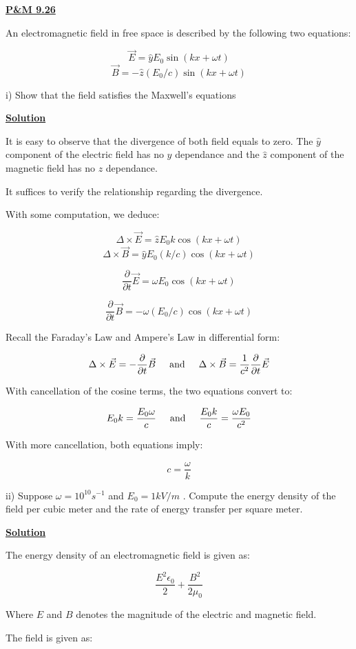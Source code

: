 \documentclass{article}
\newcommand{\new}[1]{
    \vspace{2mm}
    \noindent
    \textbf{
    \underline{#1}}
}
\newcommand{\textAnd}{
    {
        \hspace{5mm}
        \textrm{and}
        \hspace{5mm}
    }
}
\newcommand{\hy}{\hat{y}}
\newcommand{\hz}{\hat{z}}
\newcommand{\parderiv}[1]{{
    \frac{\partial}{\partial{#1}}
}
}
\begin{document}
\new{P\&M 9.26}
An electromagnetic field in free space is described 
by the following two equations:

\[
    \vec{E} = \hy E_0 \sin(kx + \omega t)
\]
\[
    \vec{B} = -\hz (E_0/c) \sin(kx + \omega t)
\]

i) Show that the field satisfies the Maxwell's equations 

\new{Solution}
It is easy to observe that the divergence of both field 
equals to zero. The $\hy$ component of the electric field 
has no $y$ dependance and the $\hz$ component of the 
magnetic field has no $z$ dependance. 

It suffices to verify the relationship regarding the divergence. 

With some computation, we deduce:

\[
    \Delta \times \vec{E} 
    = 
    \hz E_0 k \cos(kx+ \omega t)
\]
\[
    \Delta \times \vec{B}
    =
    \hy E_0(k/c) \cos(kx + \omega t)
\]

\[
    \parderiv{t} \vec{E}
    = 
    \omega E_0 \cos(kx + \omega t)
\]

\[
    \parderiv{t} \vec{B}
    =
    -\omega (E_0/c) \cos(kx + \omega t)
\]

Recall the Faraday's Law and Ampere's Law in differential form:

\[
    \Delta \times \vec{E} 
    = 
    - \parderiv{t} \vec{B}
    \textAnd
    \Delta \times \vec{B}
    =
    \frac{1}{c^2}\parderiv{t} \vec{E}
\]

With cancellation of the cosine terms, the two equations convert to:

\[
    E_0 k = \frac{E_0 \omega}{c}
    \textAnd
    \frac{E_0k}{c} = 
    \frac{\omega E_0}{c^2}
\]

With more cancellation, both equations imply:

\[
    \boxed{
    c = \frac{\omega}{k}
    }
\]


\vspace{5mm}
ii) Suppose $\omega = 10^{10}s^{-1}$ and $E_0 = 1kV/m$
. Compute the energy density of the field per cubic meter 
and the rate of energy transfer per square meter. 

\new{Solution}
The energy density of an electromagnetic field is 
given as:

\[
    \frac{E^2\epsilon_0}{2} + \frac{ B^2}{2\mu_0}
\]

Where $E$ and $B$ denotes the magnitude of the electric 
and magnetic field. 

The field is given as:
\end{document}

